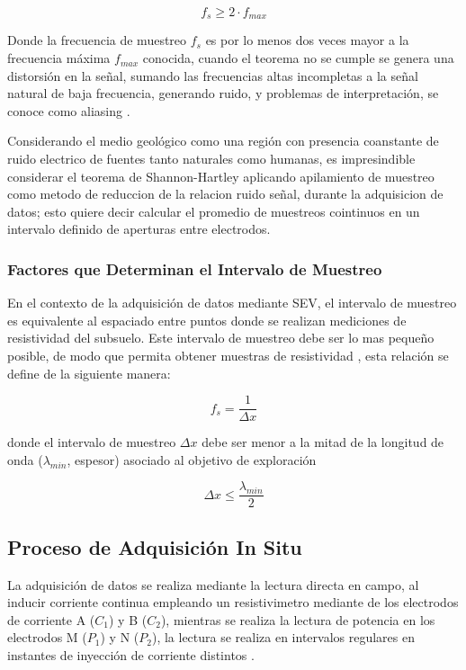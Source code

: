 			\begin{equation}
				f_{s} \geq 2 \cdot f_{max}
			\end{equation}
			
			Donde la frecuencia de muestreo $f_{s}$ es por lo menos dos veces mayor a la frecuencia máxima $f_{max}$ conocida, cuando el teorema no se cumple se genera una distorsión en la señal, sumando las frecuencias altas incompletas a la señal natural de baja frecuencia, generando ruido, y problemas de interpretación, se conoce como aliasing \citep{alvarado2010}. 
			
			Considerando el medio geológico como una región con presencia coanstante de ruido electrico de fuentes tanto naturales como humanas, es impresindible considerar el teorema de Shannon-Hartley aplicando apilamiento de muestreo como metodo de reduccion de la relacion ruido señal, durante la adquisicion de datos; esto quiere decir calcular el promedio de muestreos cointinuos en un intervalo definido de aperturas entre electrodos.
			
				
			\subsubsection{Factores que Determinan el Intervalo de Muestreo}
		
				En el contexto de la adquisición de datos mediante SEV, el intervalo de muestreo es equivalente al espaciado entre puntos donde se realizan mediciones de resistividad del subsuelo. Este intervalo de muestreo debe ser lo mas pequeño posible, de modo que permita obtener muestras de resistividad \citep{telford1990}, esta relación se define de la siguiente manera:
				
				\begin{equation}
					f_{s}= \frac{1}{\Delta x}
				\end{equation}
				
				donde el intervalo de muestreo $\Delta x$ debe ser menor a la mitad de la longitud de onda ($\lambda_{min}$, espesor) asociado al objetivo de exploración
				
				\begin{equation}
					\Delta x \leq \frac{\lambda_{min} }{2}
				\end{equation}
				
				
			
		\subsection{Proceso de Adquisición In Situ}
			La adquisición de datos se realiza mediante la lectura directa en campo, al inducir corriente continua empleando un resistivimetro mediante de los electrodos de corriente A ($C_{1}$) y B ($C_{2}$), mientras se realiza la lectura de potencia en los electrodos M ($P_{1}$) y N ($P_{2}$), la lectura se realiza en intervalos regulares en instantes de inyección de corriente distintos \citep{telford1990}.
			

